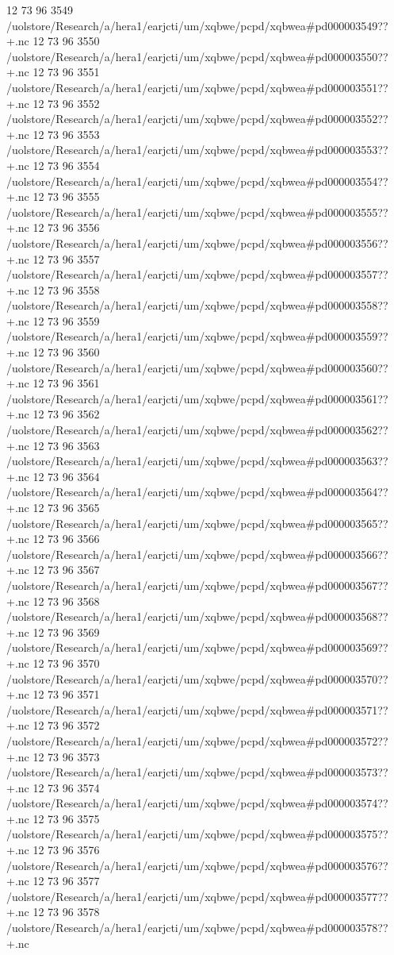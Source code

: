 12 73 96
3549
/uolstore/Research/a/hera1/earjcti/um/xqbwe/pcpd/xqbwea#pd000003549??+.nc
12 73 96
3550
/uolstore/Research/a/hera1/earjcti/um/xqbwe/pcpd/xqbwea#pd000003550??+.nc
12 73 96
3551
/uolstore/Research/a/hera1/earjcti/um/xqbwe/pcpd/xqbwea#pd000003551??+.nc
12 73 96
3552
/uolstore/Research/a/hera1/earjcti/um/xqbwe/pcpd/xqbwea#pd000003552??+.nc
12 73 96
3553
/uolstore/Research/a/hera1/earjcti/um/xqbwe/pcpd/xqbwea#pd000003553??+.nc
12 73 96
3554
/uolstore/Research/a/hera1/earjcti/um/xqbwe/pcpd/xqbwea#pd000003554??+.nc
12 73 96
3555
/uolstore/Research/a/hera1/earjcti/um/xqbwe/pcpd/xqbwea#pd000003555??+.nc
12 73 96
3556
/uolstore/Research/a/hera1/earjcti/um/xqbwe/pcpd/xqbwea#pd000003556??+.nc
12 73 96
3557
/uolstore/Research/a/hera1/earjcti/um/xqbwe/pcpd/xqbwea#pd000003557??+.nc
12 73 96
3558
/uolstore/Research/a/hera1/earjcti/um/xqbwe/pcpd/xqbwea#pd000003558??+.nc
12 73 96
3559
/uolstore/Research/a/hera1/earjcti/um/xqbwe/pcpd/xqbwea#pd000003559??+.nc
12 73 96
3560
/uolstore/Research/a/hera1/earjcti/um/xqbwe/pcpd/xqbwea#pd000003560??+.nc
12 73 96
3561
/uolstore/Research/a/hera1/earjcti/um/xqbwe/pcpd/xqbwea#pd000003561??+.nc
12 73 96
3562
/uolstore/Research/a/hera1/earjcti/um/xqbwe/pcpd/xqbwea#pd000003562??+.nc
12 73 96
3563
/uolstore/Research/a/hera1/earjcti/um/xqbwe/pcpd/xqbwea#pd000003563??+.nc
12 73 96
3564
/uolstore/Research/a/hera1/earjcti/um/xqbwe/pcpd/xqbwea#pd000003564??+.nc
12 73 96
3565
/uolstore/Research/a/hera1/earjcti/um/xqbwe/pcpd/xqbwea#pd000003565??+.nc
12 73 96
3566
/uolstore/Research/a/hera1/earjcti/um/xqbwe/pcpd/xqbwea#pd000003566??+.nc
12 73 96
3567
/uolstore/Research/a/hera1/earjcti/um/xqbwe/pcpd/xqbwea#pd000003567??+.nc
12 73 96
3568
/uolstore/Research/a/hera1/earjcti/um/xqbwe/pcpd/xqbwea#pd000003568??+.nc
12 73 96
3569
/uolstore/Research/a/hera1/earjcti/um/xqbwe/pcpd/xqbwea#pd000003569??+.nc
12 73 96
3570
/uolstore/Research/a/hera1/earjcti/um/xqbwe/pcpd/xqbwea#pd000003570??+.nc
12 73 96
3571
/uolstore/Research/a/hera1/earjcti/um/xqbwe/pcpd/xqbwea#pd000003571??+.nc
12 73 96
3572
/uolstore/Research/a/hera1/earjcti/um/xqbwe/pcpd/xqbwea#pd000003572??+.nc
12 73 96
3573
/uolstore/Research/a/hera1/earjcti/um/xqbwe/pcpd/xqbwea#pd000003573??+.nc
12 73 96
3574
/uolstore/Research/a/hera1/earjcti/um/xqbwe/pcpd/xqbwea#pd000003574??+.nc
12 73 96
3575
/uolstore/Research/a/hera1/earjcti/um/xqbwe/pcpd/xqbwea#pd000003575??+.nc
12 73 96
3576
/uolstore/Research/a/hera1/earjcti/um/xqbwe/pcpd/xqbwea#pd000003576??+.nc
12 73 96
3577
/uolstore/Research/a/hera1/earjcti/um/xqbwe/pcpd/xqbwea#pd000003577??+.nc
12 73 96
3578
/uolstore/Research/a/hera1/earjcti/um/xqbwe/pcpd/xqbwea#pd000003578??+.nc

